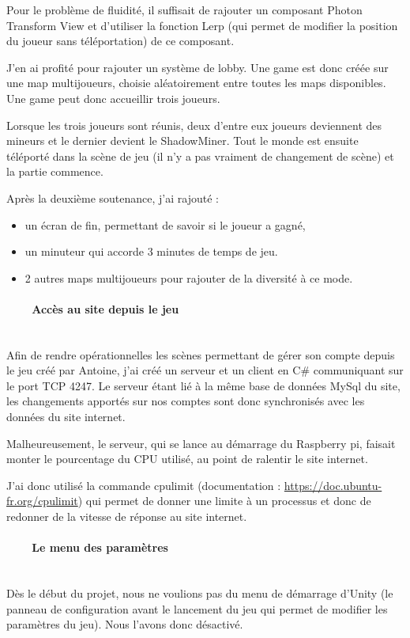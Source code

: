 \documentclass[titlepage, 13px, a4paper]{report}
\begin{document}
Pour le problème de fluidité, il suffisait de rajouter un composant Photon Transform View et d’utiliser la 
fonction Lerp (qui permet de modifier la position du joueur sans téléportation) de ce composant.

J’en ai profité pour rajouter un système de lobby. Une game est donc créée sur une map multijoueurs, choisie 
aléatoirement entre toutes les maps disponibles. Une game peut donc accueillir trois joueurs.

Lorsque les trois joueurs sont réunis, deux d'entre eux joueurs deviennent des mineurs et le dernier devient le ShadowMiner.
Tout le monde est ensuite téléporté dans la scène de jeu (il n’y a pas vraiment de changement de scène) et la partie commence.

Après la deuxième soutenance, j’ai rajouté : \\
{\begin{itemize}
	\item un écran de fin, permettant de savoir si le joueur a gagné,
	\item un minuteur qui accorde 3 minutes de temps de jeu.
	\item 2 autres maps multijoueurs pour rajouter de la diversité à ce mode. \\
\end{itemize}}

\paragraph{~~~~Accès au site depuis le jeu} \hspace{0pt} \\
Afin de rendre opérationnelles les scènes permettant de gérer son compte depuis le jeu créé par Antoine,
j’ai créé un serveur et un client en C\# communiquant sur le port TCP 4247. Le serveur étant lié à la même 
base de données MySql du site, les changements apportés sur nos comptes sont donc synchronisés avec les données du site internet.

Malheureusement, le serveur, qui se lance au démarrage du Raspberry pi, faisait monter le pourcentage 
du CPU utilisé, au point de ralentir le site internet.

J’ai donc utilisé la commande cpulimit (documentation : \url{https://doc.ubuntu-fr.org/cpulimit}) qui permet de donner une 
limite à un processus et donc de redonner de la vitesse de réponse au site internet. \\


\paragraph{~~~~Le menu des paramètres} \hspace{0pt} \\
Dès le début du projet, nous ne voulions pas du menu de démarrage d’Unity (le panneau de configuration avant 
le lancement du jeu qui permet de modifier les paramètres du jeu). Nous l’avons donc désactivé.
\end{document}
